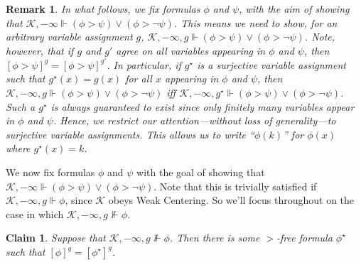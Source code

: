 \documentclass[12pt]{article}
\newtheorem{claim}{Claim}
\newtheorem{remark}{Remark}
\newcommand{\would}{\mathbin{>}}
\begin{document}
\begin{remark}\label{surjective}
    In what follows, we \emph{fix} formulas $\phi$ and $\psi$, with the aim of showing that $\mathcal{K},-\infty \Vdash (\phi \would \psi) \vee (\phi \would \neg\psi)$. 
    This means we need to show, for an \emph{arbitrary} variable assignment $g$, $\mathcal{K},-\infty, g \Vdash (\phi \would \psi) \vee (\phi \would \neg\psi)$. 
    Note, however, that if $g$ and $g'$ agree on all variables appearing in $\phi$ and $\psi$, then $[\phi \would \psi]^g = [\phi \would \psi]^{g'}$. 
    In particular, if $g^\star$ is a surjective variable assignment such that $g^\star(x) = g(x)$ for all $x$ appearing in $\phi$ and $\psi$, then $\mathcal{K},-\infty,g \Vdash (\phi \would \psi) \vee (\phi \would \neg\psi)$ iff $\mathcal{K},-\infty,g^\star \Vdash (\phi \would \psi) \vee (\phi \would \neg\psi)$. 
    Such a $g^\star$ is always guaranteed to exist since only finitely many variables appear in $\phi$ and $\psi$. 
    Hence, we restrict our attention---without loss of generality---to surjective variable assignments. 
    This allows us to write ``$\phi(k)$'' for $\phi(x)$ where $g^\star(x) = k$. 
\end{remark}

We now fix formulas $\phi$ and $\psi$ with the goal of showing that $\mathcal{K},-\infty \Vdash (\phi \would \psi) \vee (\phi \would \neg\psi)$. 
Note that this is trivially satisfied if $\mathcal{K},-\infty,g \Vdash \phi$, since $\mathcal{K}$ obeys Weak Centering. 
So we'll focus throughout on the case in which $\mathcal{K},-\infty,g \nVdash \phi$. 



\begin{claim}\label{would-free}
    Suppose that $\mathcal{K},-\infty,g \nVdash \phi$. Then there is some $>$-free formula $\phi^\star$ such that $[\phi]^g=[\phi^\star]^g$.
\end{claim}
\end{document}
